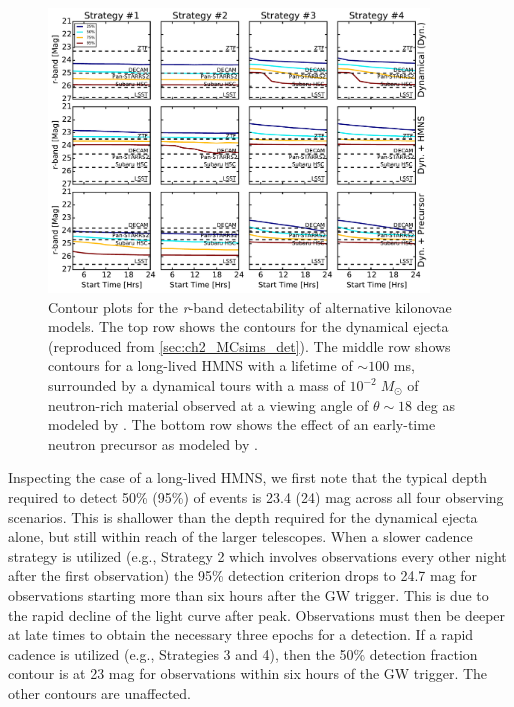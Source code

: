 \begin{figure}[t!]
\centering
\includegraphics[width=0.9\textwidth]{./figs/chapter2/ch2_f19.pdf}
\caption{Contour plots for the {\em r}-band detectability of alternative kilonovae models. The top row shows the contours for the dynamical ejecta (reproduced from \autoref{sec:ch2_MCsims_det}). The middle row shows contours for a long-lived HMNS with a lifetime of $\sim 100$ ms, surrounded by a dynamical tours with a mass of $10^{-2}\;M_{\odot}$  of neutron-rich material observed at a viewing angle of $\theta \sim 18$ deg as modeled by \citet{Kasen+15}. The bottom row shows the effect of an early-time neutron precursor as modeled by \citet{Metzger+15}.}
\label{fig:ch2_altdet}
\end{figure}

Inspecting the case of a long-lived HMNS, we first note that the typical depth required to detect 50\% (95\%) of events is 23.4 (24) mag across all four observing scenarios. This is shallower than the depth required for the dynamical ejecta alone, but still within reach of the larger telescopes. When a slower cadence strategy is utilized (e.g., Strategy 2 which involves observations every other night after the first observation) the 95\% detection criterion drops to 24.7 mag for observations starting more than six hours after the GW trigger. This is due to the rapid decline of the light curve after peak. Observations must then be deeper at late times to obtain the necessary three epochs for a detection. If a rapid cadence is utilized (e.g., Strategies 3 and 4), then the 50\% detection fraction contour is at 23 mag for observations within six hours of the GW trigger. The other contours are unaffected.

